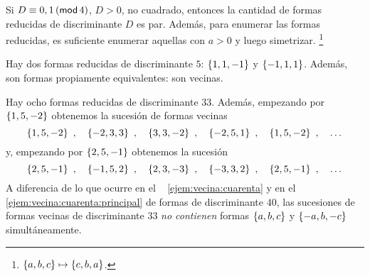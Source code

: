 \begin{coroIndefinidas}\label{coro:indefinidas:reducidas}
	Si $D\equiv 0,1\tmodulo[4]$, $D>0$, no cuadrado, entonces
	la cantidad de formas reducidas de discriminante $D$ es par.
	Adem\'as, para enumerar las formas reducidas, es suficiente
	enumerar aquellas con $a>0$ y luego simetrizar.%
	\footnote{
		$\binaria{a,b,c}\mapsto\binaria{c,b,a}$.
	}
\end{coroIndefinidas}

\begin{ejemIndefinidas}\label{ejem:reducidas:cinco}
	Hay dos formas reducidas de discriminante $5$:
	$\binaria{1,1,-1}$ y $\binaria{-1,1,1}$. Adem\'as, son
	formas propiamente equivalentes: son vecinas.
\end{ejemIndefinidas}

\begin{ejemIndefinidas}\label{ejem:reducidas:veintinueve}
	Hay ocho formas reducidas de discriminante $33$.
	Adem\'as, empezando por $\binaria{1,5,-2}$ obtenemos la sucesi\'on
	de formas vecinas
	\begin{displaymath}
		\binaria{1,5,-2}\dispcomma\quad
			\binaria{-2,3,3}\dispcomma\quad
			\binaria{3,3,-2}\dispcomma\quad
			\binaria{-2,5,1}\dispcomma\quad
			\binaria{1,5,-2}\dispcomma\quad\dots
	\end{displaymath}
	y, empezando por $\binaria{2,5,-1}$ obtenemos la sucesi\'on
	\begin{displaymath}
		\binaria{2,5,-1}\dispcomma\quad
			\binaria{-1,5,2}\dispcomma\quad
			\binaria{2,3,-3}\dispcomma\quad
			\binaria{-3,3,2}\dispcomma\quad
			\binaria{2,5,-1}\dispcomma\quad\dots
	\end{displaymath}
	A diferencia de lo que ocurre en el \ejemname~%
	\ref{ejem:vecina:cuarenta} y en el \ejemname~%
	\ref{ejem:vecina:cuarenta:principal} de formas de discriminante $40$,
	las sucesiones de formas vecinas de discriminante $33$
	\emph{no contienen} formas $\binaria{a,b,c}$ y $\binaria{-a,b,-c}$
	simult\'aneamente.
\end{ejemIndefinidas}

